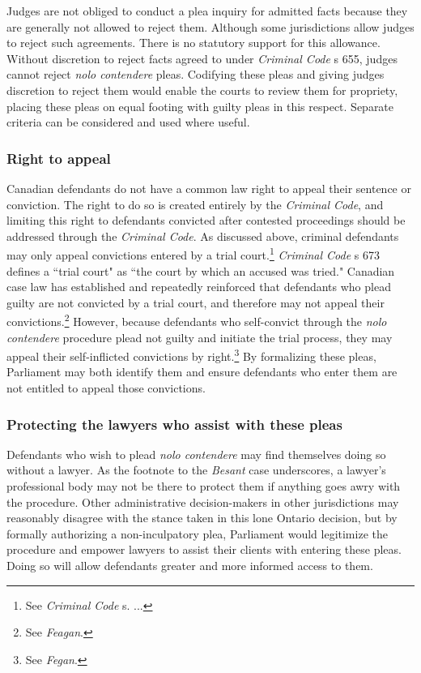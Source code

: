 Judges are not obliged to conduct a plea inquiry for admitted facts because they are generally not allowed to reject them. Although some jurisdictions allow judges to reject such agreements. There is no statutory support for this allowance. Without discretion to reject facts agreed to under \textit{Criminal Code} s 655, judges cannot reject \textit{nolo contendere} pleas. Codifying these pleas and giving judges discretion to reject them would enable the courts to review them for propriety, placing these pleas on equal footing with guilty pleas in this respect. Separate criteria can be considered and used where useful.

\subsubsection{Right to appeal}

Canadian defendants do not have a common law right to appeal their sentence or conviction. The right to do so is created entirely by the \textit{Criminal Code}, and limiting this right to defendants convicted after contested proceedings should be addressed through the \textit{Criminal Code}. As discussed above, criminal defendants may only appeal convictions entered by a trial court.\footnote{See \textit{Criminal Code} s. ... } \textit{Criminal Code} s 673 defines a ``trial court" as ``the court by which an accused was tried." Canadian case law has established and repeatedly reinforced that defendants who plead guilty are not convicted by a trial court, and therefore may not appeal their convictions.\footnote{See \textit{Feagan}.} However, because defendants who self-convict through the \textit{nolo contendere} procedure plead not guilty and initiate the trial process, they may appeal their self-inflicted convictions by right.\footnote{See \textit{Fegan}.} By formalizing these pleas, Parliament may both identify them and ensure defendants who enter them are not entitled to appeal those convictions.

\subsubsection{Protecting the lawyers who assist with these pleas}

Defendants who wish to plead \textit{nolo contendere} may find themselves doing so without a lawyer. As the footnote to the \textit{Besant} case underscores, a lawyer's professional body may not be there to protect them if anything goes awry with the procedure. Other administrative decision-makers in other jurisdictions may reasonably disagree with the stance taken in this lone Ontario decision, but by formally authorizing a non-inculpatory plea, Parliament would legitimize the procedure and empower lawyers to assist their clients with entering these pleas. Doing so will allow defendants greater and more informed access to them.

